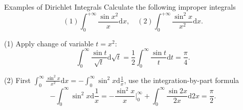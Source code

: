 \begin{example}{Examples of Dirichlet Integrals}{}
  Calculate the following improper integrals
  \begin{equation}
    (1) \int_0^{+\infty} \frac{\sin x^2}{x}\mathrm{d} x, \quad
    (2) \int_0^{+\infty} \frac{\sin^2 x}{x^2} \mathrm{d} x.
  \end{equation}
\end{example}

\begin{solution}
  (1) Apply change of variable $t = x^2$:
  \begin{equation}
    \int_0^{\infty} \frac{\sin t}{\sqrt{t}}\mathrm{d} \sqrt{t}
    = \frac{1}{2} \int_0^{\infty} \frac{\sin t}{t}\mathrm{d} t
    = \frac{\pi}{4}.
  \end{equation}

  (2) First $\int_0^{\infty} \frac{\sin^2 x}{x^2}\mathrm{d} x =
  - \int_0^{\infty} \sin^2x \mathrm{d} \frac{1}{x}$, use the integration-by-part formula
  \begin{equation}
    - \int_0^{\infty} \sin^2 x \mathrm{d} \frac{1}{x}
    = - \frac{\sin^2 x}{x} \big|^{\infty}_0 + \int_0 ^{\infty} \frac{\sin 2x}{2x}\mathrm{d} 2x
    = \frac{\pi}{2}.
  \end{equation}
\end{solution}






